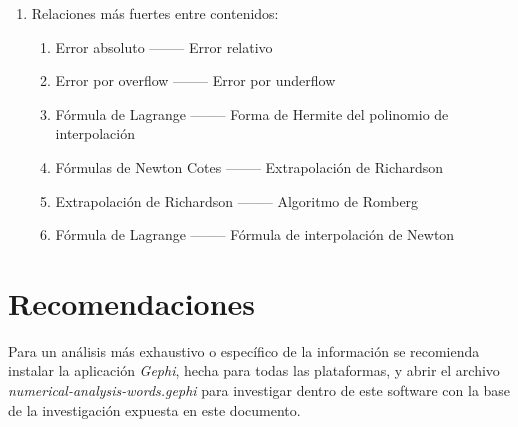 \documentclass[a4paper,10pt,twocolumn]{article}
\begin{document}
\begin{enumerate}
        \item Relaciones más fuertes entre contenidos:
        \begin{enumerate}
            \item Error absoluto              --------              Error relativo
            \item Error por overflow          --------              Error por underflow
            \item Fórmula de Lagrange         --------              Forma de Hermite del polinomio de interpolación
            \item Fórmulas de Newton Cotes    --------              Extrapolación de Richardson
            \item Extrapolación de Richardson --------              Algoritmo de Romberg
            \item Fórmula de Lagrange         --------              Fórmula de interpolación de Newton
        \end{enumerate}
        
    \end{enumerate}




  

  
  




\section{Recomendaciones}\label{sec:rec}

  Para un análisis más exhaustivo o específico de la información se recomienda instalar la aplicación \emph{Gephi}, hecha para todas las plataformas, y abrir el archivo \emph{numerical-analysis-words.gephi} para investigar dentro de este software con la base de la investigación expuesta en este documento.
\end{document}
